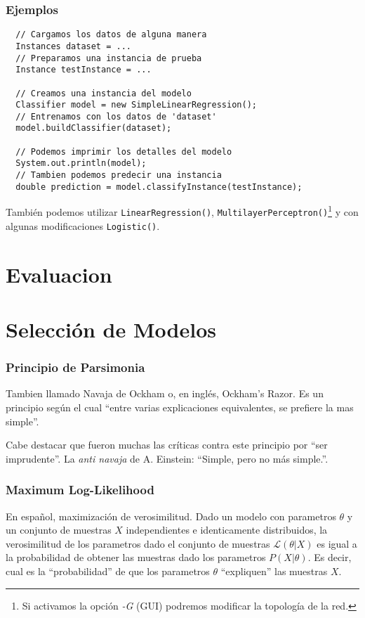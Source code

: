 \documentclass[10pt,a4paper]{article}
\begin{document}
\section{Ejemplos}

\begin{lstlisting}
  // Cargamos los datos de alguna manera
  Instances dataset = ...
  // Preparamos una instancia de prueba
  Instance testInstance = ...
  
  // Creamos una instancia del modelo
  Classifier model = new SimpleLinearRegression();
  // Entrenamos con los datos de 'dataset'
  model.buildClassifier(dataset);
  
  // Podemos imprimir los detalles del modelo
  System.out.println(model);
  // Tambien podemos predecir una instancia
  double prediction = model.classifyInstance(testInstance);
\end{lstlisting}

También podemos utilizar \lstinline{LinearRegression()}, \lstinline{MultilayerPerceptron()}\footnote{Si activamos la opción \textit{-G} (GUI) podremos modificar la topología de la red.} y con algunas modificaciones \lstinline{Logistic()}.

\part{Evaluacion}

\part{Selección de Modelos}
\section{Principio de Parsimonia}
Tambien llamado Navaja de Ockham o, en inglés, Ockham's Razor. Es un principio según el cual ``entre varias explicaciones equivalentes, se prefiere la mas simple''. 

Cabe destacar que fueron muchas las críticas contra este principio por ``ser imprudente''. La \textit{anti navaja} de A. Einstein: ``Simple, pero no más simple.''.

\section{Maximum Log-Likelihood}
En español, maximización de verosimilitud. Dado un modelo con parametros $\theta$ y un conjunto de muestras $X$ independientes e identicamente distribuidos, la verosimilitud de los parametros dado el conjunto de muestras $\mathcal{L}(\theta|X)$ es igual a la probabilidad de obtener las muestras dado los parametros $P(X|\theta)$. Es decir, cual es la ``probabilidad'' de que los parametros $\theta$ ``expliquen'' las muestras $X$.
\end{document}
